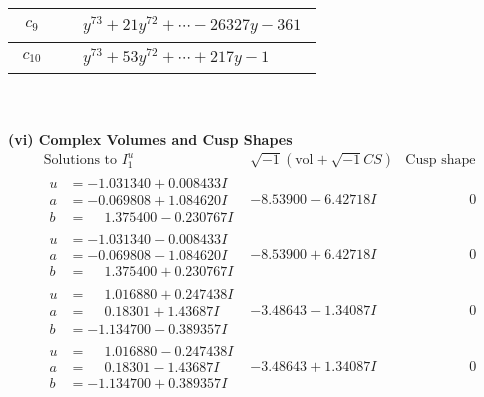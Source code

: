 \documentclass[1p]{elsarticle_modified}
\theoremstyle{definition}
\newcommand{\I}{\sqrt{-1}}
\begin{document}
\begin{tabular}{m{50pt}|m{274pt}}
\hline $$\begin{aligned}c_{9}\end{aligned}$$&$\begin{aligned}
&y^{73}+21 y^{72}+\cdots-26327 y-361
\end{aligned}$\\
\hline $$\begin{aligned}c_{10}\end{aligned}$$&$\begin{aligned}
&y^{73}+53 y^{72}+\cdots+217 y-1
\end{aligned}$\\
\hline
\end{tabular}\\~\\
\newpage\flushleft \textbf{(vi) Complex Volumes and Cusp Shapes}
$$\begin{array}{c|c|c}  
\text{Solutions to }I^u_{1}& \I (\text{vol} + \sqrt{-1}CS) & \text{Cusp shape}\\
 \hline 
\begin{aligned}
u &= -1.031340 + 0.008433 I \\
a &= -0.069808 + 1.084620 I \\
b &= \phantom{-}1.375400 - 0.230767 I\end{aligned}
 & -8.53900 - 6.42718 I & \phantom{-0.000000 } 0 \\ \hline\begin{aligned}
u &= -1.031340 - 0.008433 I \\
a &= -0.069808 - 1.084620 I \\
b &= \phantom{-}1.375400 + 0.230767 I\end{aligned}
 & -8.53900 + 6.42718 I & \phantom{-0.000000 } 0 \\ \hline\begin{aligned}
u &= \phantom{-}1.016880 + 0.247438 I \\
a &= \phantom{-}0.18301 + 1.43687 I \\
b &= -1.134700 - 0.389357 I\end{aligned}
 & -3.48643 - 1.34087 I & \phantom{-0.000000 } 0 \\ \hline\begin{aligned}
u &= \phantom{-}1.016880 - 0.247438 I \\
a &= \phantom{-}0.18301 - 1.43687 I \\
b &= -1.134700 + 0.389357 I\end{aligned}
 & -3.48643 + 1.34087 I & \phantom{-0.000000 } 0 \\ \hline\begin{aligned}

\end{aligned}
\end{array}$$
\end{document}
